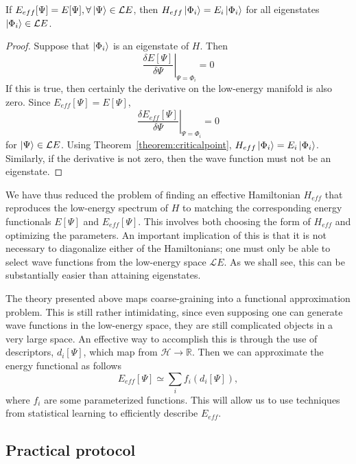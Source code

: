 \begin{theorem} 	
If $E_{eff}[\Psi] = E[\Psi], \forall \ket{\Psi} \in {\mathcal LE}$, then $H_{eff} \ket{\Phi_i} = E_i\ket{\Phi_i}$ for all eigenstates $\ket{\Phi_i}\in {\mathcal LE}$.
\end{theorem}
\begin{proof}
	Suppose that $\ket{\Phi_i}$ is an eigenstate of $H$. Then 
	\begin{equation}
	\left.\frac{\delta E[\Psi]}{\delta\Psi}\right|_{\Psi=\Phi_i} = 0 
	\end{equation}
If this is true, then certainly the derivative on the low-energy manifold is also zero.
Since $E_{eff}[\Psi] = E[\Psi]$, 
\begin{equation}
	\left.\frac{\delta E_{eff}[\Psi]}{\delta\Psi}\right|_{\Psi=\Phi_i} = 0 
\end{equation}
for $\ket{\Psi} \in {\mathcal LE}$. Using Theorem~\ref{theorem:criticalpoint}, $H_{eff} \ket{\Phi_i} = E_i\ket{\Phi_i}$. 
Similarly, if the derivative is not zero, then the wave function must not be an eigenstate.
\end{proof}

We have thus reduced the problem of finding an effective Hamiltonian $H_{eff}$ that reproduces the low-energy spectrum of $H$ to matching the corresponding energy functionals $E[\Psi]$ and $E_{eff}[\Psi]$. 
This involves both choosing the form of $H_{eff}$ and optimizing the parameters.
An important implication of this is that it is not necessary to diagonalize either of the Hamiltonians; one must only be able to select wave functions from the low-energy space ${\mathcal LE}$.
As we shall see, this can be substantially easier than attaining eigenstates.


The theory presented above maps coarse-graining into a functional approximation problem. 
This is still rather intimidating, since even supposing one can generate wave functions in the low-energy space, they are still complicated objects in a very large space.
An effective way to accomplish this is through the use of descriptors, $d_i[\Psi]$, which map from ${\mathcal H} \rightarrow \mathbb{R}$.
Then we can approximate the energy functional as follows
\begin{equation}
E_{eff}[\Psi] \simeq \sum_i f_i(d_i[\Psi]),
\end{equation}
where $f_i$ are some parameterized functions.
This will allow us to use techniques from statistical learning to efficiently describe $E_{eff}$. 
\subsection{Practical protocol}

